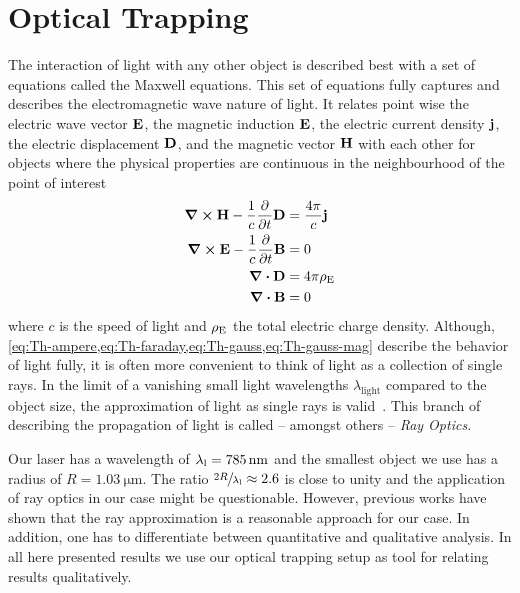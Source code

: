 \section{Optical Trapping\label{sec:Th-trapping}}

The interaction of light with any other object is described best with a set of 
equations called the Maxwell equations. This set of equations fully captures 
and describes the electromagnetic wave nature of light. It relates point wise 
the electric wave vector $\vb{E}$, the magnetic induction $\vb{E}$, the 
electric current density $\vb{j}$, the electric displacement $\vb{D}$, and the 
magnetic vector $\vb{H}$ with each other for objects where the physical 
properties are continuous in the neighbourhood of the point of 
interest~\cite{Born1980Ch1}
\begin{subequations}
  \begin{align}
    \curl{\vb{H}} - \frac{1}{c}\pdv{t}\vb{D} &=\frac{4\pi}{c}\vb{j} 
    \label{eq:Th-ampere} \\
    \curl{\vb{E}} - \frac{1}{c}\pdv{t}\vb{B} &=  0
    \label{eq:Th-faraday} \\
    \div{\vb{D}} &= 4\pi\rho_{\mathrm{E}}
    \label{eq:Th-gauss} \\
    \div{\vb{B}} &= 0
    \label{eq:Th-gauss-mag}
  \end{align}
\end{subequations}
where $c$ is the speed of light and $\rho_{\mathrm{E}}$ the total electric charge 
density. Although, 
\cref{eq:Th-ampere,eq:Th-faraday,eq:Th-gauss,eq:Th-gauss-mag} describe the 
behavior of light fully, it is often more convenient to think of light as a 
collection of single rays. In the limit of a vanishing small light wavelengths 
$\lambda_{\text{light}}$ compared to the object size, the approximation of 
light as single rays is valid~\cite{Born1980Ch3}. This branch of describing the 
propagation of light is called -- amongst others -- \emph{Ray Optics}.

Our laser has a wavelength of $\lal=\SI{785}{\nm}$ and the smallest object we 
use has a radius of $R=\SI{1.03}{\um}$. The ratio $\sfrac{2R}{\lambda_{\mathrm{l}}}\approx 2.6$ 
is close to unity and the application of ray optics in our case might be 
questionable. However, previous works 
\cite{Lakaemper2015,Lamprecht2016,Lamprecht2017} have shown that the ray 
approximation is a reasonable approach for our case. In addition, one has to 
differentiate between quantitative and qualitative analysis. In all here 
presented results we use our optical trapping setup as tool for relating 
results qualitatively.


